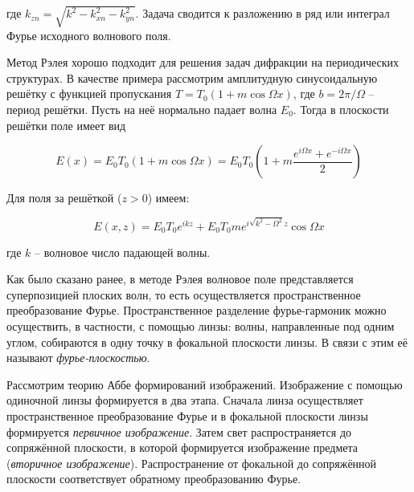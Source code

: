 \noindent
где $k_{z n} = \sqrt{k^2 - k_{x n}^2 - k_{y n}^2}$. Задача сводится к разложению в ряд или интеграл Фурье исходного волнового поля.

Метод Рэлея хорошо подходит для решения задач дифракции на периодических структурах. В качестве примера рассмотрим амплитудную синусоидальную решётку с функцией пропускания $T = T_0 \left( 1 + m \cos \Omega x \right)$, где $b = 2 \pi / \Omega$ -- период решётки. Пусть на неё нормально падает волна $E_0$. Тогда в плоскости решётки поле имеет вид

\begin{equation}
    E(x) = E_0 T_0 \left( 1 + m \cos \Omega x \right) = E_0 T_0 \left( 1 + m \frac{e^{i \Omega x} + e^{- i \Omega x}}{2} \right)
\end{equation}

\noindent
Для поля за решёткой ($z > 0$) имеем:

\begin{equation}
    E(x, z) = E_0 T_0 e^{i k z} + E_0 T_0 m e^{i \sqrt{k^2 - \Omega^2} z} \cos \Omega x
\end{equation}

\noindent
где $k$ -- волновое число падающей волны.

Как было сказано ранее, в методе Рэлея волновое поле представляется суперпозицией плоских волн, то есть осуществляется пространственное преобразование Фурье. Пространственное разделение фурье-гармоник можно осуществить, в частности, с помощью линзы: волны, направленные под одним углом, собираются в одну точку в фокальной плоскости линзы. В связи с этим её называют \textit{фурье-плоскостью}.

Рассмотрим теорию Аббе формирований изображений. Изображение с помощью одиночной линзы формируется в два этапа. Сначала линза осуществляет пространственное преобразование Фурье и в фокальной плоскости линзы формируется \textit{первичное изображение}.  Затем свет распространяется до сопряжённой плоскости, в которой формируется изображение предмета (\textit{вторичное изображение}). Распространение от фокальной до сопряжённой плоскости соответствует обратному преобразованию Фурье.